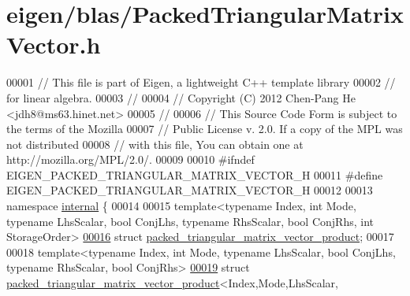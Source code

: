 \hypertarget{eigen_2blas_2_packed_triangular_matrix_vector_8h_source}{}\section{eigen/blas/\+Packed\+Triangular\+Matrix\+Vector.h}
\label{eigen_2blas_2_packed_triangular_matrix_vector_8h_source}

\begin{DoxyCode}
00001 \textcolor{comment}{// This file is part of Eigen, a lightweight C++ template library}
00002 \textcolor{comment}{// for linear algebra.}
00003 \textcolor{comment}{//}
00004 \textcolor{comment}{// Copyright (C) 2012 Chen-Pang He <jdh8@ms63.hinet.net>}
00005 \textcolor{comment}{//}
00006 \textcolor{comment}{// This Source Code Form is subject to the terms of the Mozilla}
00007 \textcolor{comment}{// Public License v. 2.0. If a copy of the MPL was not distributed}
00008 \textcolor{comment}{// with this file, You can obtain one at http://mozilla.org/MPL/2.0/.}
00009 
00010 \textcolor{preprocessor}{#ifndef EIGEN\_PACKED\_TRIANGULAR\_MATRIX\_VECTOR\_H}
00011 \textcolor{preprocessor}{#define EIGEN\_PACKED\_TRIANGULAR\_MATRIX\_VECTOR\_H}
00012 
00013 \textcolor{keyword}{namespace }\hyperlink{namespaceinternal}{internal} \{
00014 
00015 \textcolor{keyword}{template}<\textcolor{keyword}{typename} Index, \textcolor{keywordtype}{int} Mode, \textcolor{keyword}{typename} LhsScalar, \textcolor{keywordtype}{bool} ConjLhs, \textcolor{keyword}{typename} RhsScalar, \textcolor{keywordtype}{bool} ConjRhs, \textcolor{keywordtype}{int} 
      StorageOrder>
\hyperlink{structinternal_1_1packed__triangular__matrix__vector__product}{00016} \textcolor{keyword}{struct }\hyperlink{structinternal_1_1packed__triangular__matrix__vector__product}{packed\_triangular\_matrix\_vector\_product};
00017 
00018 \textcolor{keyword}{template}<\textcolor{keyword}{typename} Index, \textcolor{keywordtype}{int} Mode, \textcolor{keyword}{typename} LhsScalar, \textcolor{keywordtype}{bool} ConjLhs, \textcolor{keyword}{typename} RhsScalar, \textcolor{keywordtype}{bool} ConjRhs>
\hyperlink{structinternal_1_1packed__triangular__matrix__vector__product_3_01_index_00_01_mode_00_01_lhs_scbd6db00b6d9348a4e2779e2616adcdaa}{00019} \textcolor{keyword}{struct }\hyperlink{structinternal_1_1packed__triangular__matrix__vector__product}{packed\_triangular\_matrix\_vector\_product}<Index,Mode,LhsScalar,

\end{DoxyCode}
